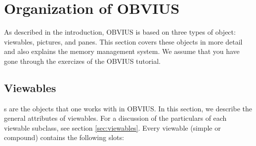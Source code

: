 \section{Organization of OBVIUS}
\label{sec:organization}

As described in the introduction, OBVIUS is based on three types of
object: viewables, pictures, and panes.  This section covers these
objects in more detail and also explains the memory management system.
We assume that you have gone through the exercizes of the OBVIUS
tutorial.


\subsection{Viewables}

s are the objects that one works with in OBVIUS.
In this section, we describe the general
attributes of viewables.  For a discussion of the particulars of each
viewable subclass, see section
\ref{sec:viewables}.  Every viewable (simple or compound) contains the
following slots:

